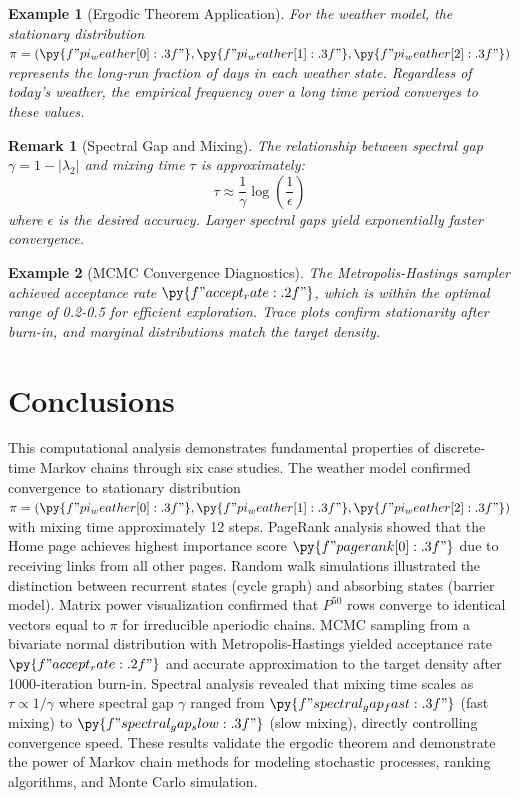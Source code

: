 \documentclass[11pt,a4paper]{article}
\newtheorem{example}{Example}[section]
\newtheorem{remark}{Remark}[section]
\begin{document}
\begin{example}[Ergodic Theorem Application]
For the weather model, the stationary distribution $\pi = (\py{f"{pi_weather[0]:.3f}"}, \py{f"{pi_weather[1]:.3f}"}, \py{f"{pi_weather[2]:.3f}"})$ represents the long-run fraction of days in each weather state. Regardless of today's weather, the empirical frequency over a long time period converges to these values.
\end{example}

\begin{remark}[Spectral Gap and Mixing]
The relationship between spectral gap $\gamma = 1 - |\lambda_2|$ and mixing time $\tau$ is approximately:
\begin{equation}
\tau \approx \frac{1}{\gamma} \log\left(\frac{1}{\epsilon}\right)
\end{equation}
where $\epsilon$ is the desired accuracy. Larger spectral gaps yield exponentially faster convergence.
\end{remark}

\begin{example}[MCMC Convergence Diagnostics]
The Metropolis-Hastings sampler achieved acceptance rate $\py{f"{accept_rate:.2f}"}$, which is within the optimal range of 0.2-0.5 for efficient exploration. Trace plots confirm stationarity after burn-in, and marginal distributions match the target density.
\end{example}

\section{Conclusions}

This computational analysis demonstrates fundamental properties of discrete-time Markov chains through six case studies. The weather model confirmed convergence to stationary distribution $\pi = (\py{f"{pi_weather[0]:.3f}"}, \py{f"{pi_weather[1]:.3f}"}, \py{f"{pi_weather[2]:.3f}"})$ with mixing time approximately 12 steps. PageRank analysis showed that the Home page achieves highest importance score $\py{f"{pagerank[0]:.3f}"}$ due to receiving links from all other pages. Random walk simulations illustrated the distinction between recurrent states (cycle graph) and absorbing states (barrier model). Matrix power visualization confirmed that $P^{50}$ rows converge to identical vectors equal to $\pi$ for irreducible aperiodic chains. MCMC sampling from a bivariate normal distribution with Metropolis-Hastings yielded acceptance rate $\py{f"{accept_rate:.2f}"}$ and accurate approximation to the target density after 1000-iteration burn-in. Spectral analysis revealed that mixing time scales as $\tau \propto 1/\gamma$ where spectral gap $\gamma$ ranged from $\py{f"{spectral_gap_fast:.3f}"}$ (fast mixing) to $\py{f"{spectral_gap_slow:.3f}"}$ (slow mixing), directly controlling convergence speed. These results validate the ergodic theorem and demonstrate the power of Markov chain methods for modeling stochastic processes, ranking algorithms, and Monte Carlo simulation.
\end{document}
